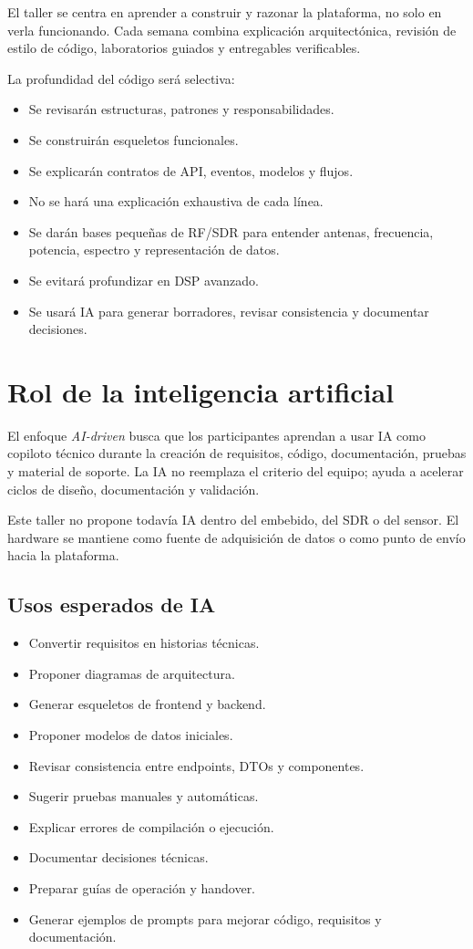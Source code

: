 \documentclass[11pt,a4paper]{article}
\newcommand{\aidriven}{\textit{AI-driven}}
\begin{document}
El taller se centra en aprender a construir y razonar la plataforma, no solo en verla funcionando. Cada semana combina explicación arquitectónica, revisión de estilo de código, laboratorios guiados y entregables verificables.

La profundidad del código será selectiva:

\begin{itemize}
  \item Se revisarán estructuras, patrones y responsabilidades.
  \item Se construirán esqueletos funcionales.
  \item Se explicarán contratos de API, eventos, modelos y flujos.
  \item No se hará una explicación exhaustiva de cada línea.
  \item Se darán bases pequeñas de RF/SDR para entender antenas, frecuencia, potencia, espectro y representación de datos.
  \item Se evitará profundizar en DSP avanzado.
  \item Se usará IA para generar borradores, revisar consistencia y documentar decisiones.
\end{itemize}

\section*{Rol de la inteligencia artificial}

El enfoque \aidriven{} busca que los participantes aprendan a usar IA como copiloto técnico durante la creación de requisitos, código, documentación, pruebas y material de soporte. La IA no reemplaza el criterio del equipo; ayuda a acelerar ciclos de diseño, documentación y validación.

Este taller no propone todavía IA dentro del embebido, del SDR o del sensor. El hardware se mantiene como fuente de adquisición de datos o como punto de envío hacia la plataforma.

\subsection*{Usos esperados de IA}

\begin{itemize}
  \item Convertir requisitos en historias técnicas.
  \item Proponer diagramas de arquitectura.
  \item Generar esqueletos de frontend y backend.
  \item Proponer modelos de datos iniciales.
  \item Revisar consistencia entre endpoints, DTOs y componentes.
  \item Sugerir pruebas manuales y automáticas.
  \item Explicar errores de compilación o ejecución.
  \item Documentar decisiones técnicas.
  \item Preparar guías de operación y handover.
  \item Generar ejemplos de prompts para mejorar código, requisitos y documentación.
\end{itemize}
\end{document}
